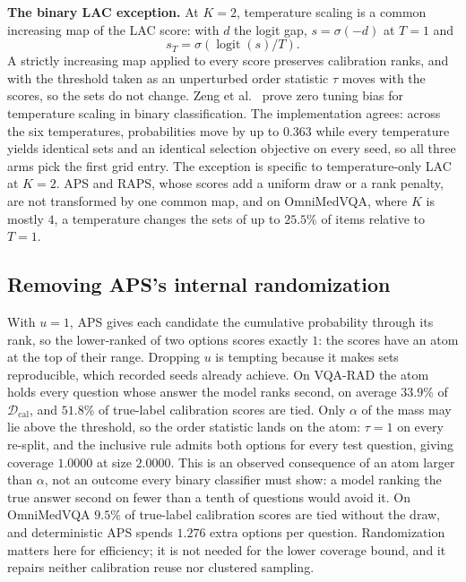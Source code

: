 \documentclass[a4paper,conference]{IEEEtran}
\newcommand{\Dcal}{\mathcal{D}_{\mathrm{cal}}}
\newcommand{\rtag}[1]{}
\begin{document}
\textbf{The binary LAC exception.} At $K=2$, temperature scaling is a common
increasing map of the LAC score: with $d$ the logit gap, $s=\sigma(-d)$ at
$T=1$ and
\begin{equation*}
s_T=\sigma\!\left(\operatorname{logit}(s)/T\right).
\end{equation*}
A strictly increasing map applied to every score preserves calibration ranks,
and with the threshold taken as an unperturbed order statistic $\tau$ moves
with the scores, so the sets do not change. Zeng et al.\
\cite[Prop.~5.1]{zeng2025tuningbias} prove zero tuning bias for temperature
scaling in binary classification. The implementation agrees: across the six
temperatures, probabilities move by up to $0.363$ while every temperature yields
identical sets and an identical selection objective on every seed, so all
three arms pick the first grid entry. The exception is specific to
temperature-only LAC at $K=2$. APS and RAPS, whose scores add a uniform draw
or a rank penalty, are not transformed by one common map, and on OmniMedVQA,
where $K$ is mostly $4$, a temperature changes the sets of up to $25.5\%$ of
items relative to $T=1$.

\subsection{Removing APS's internal randomization}

With $u=1$, APS gives each candidate the cumulative probability through its
rank, so the lower-ranked of two options scores exactly $1$: the scores have an
atom at the top of their range. Dropping $u$ is tempting because it makes sets
reproducible, which recorded seeds already achieve. On VQA-RAD the atom holds
every question whose answer the model ranks second, on average $33.9\%$ of
$\Dcal$, and $51.8\%$ of true-label calibration scores are tied. Only $\alpha$
of the mass may lie above the threshold, so the order statistic lands on the
atom: $\tau=1$ on every re-split, and the inclusive rule admits both options for
every test question, giving coverage $1.0000$ at size $2.0000$. This is an
observed consequence of an atom larger than $\alpha$, not an outcome every
binary classifier must show: a model ranking the true answer second on fewer
than a tenth of questions would avoid it.\rtag{R2.1} On OmniMedVQA $9.5\%$ of true-label
calibration scores are tied without the draw, and deterministic APS spends
$1.276$ extra options per question. Randomization matters here for efficiency;
it is not needed for the lower coverage bound, and it repairs neither
calibration reuse nor clustered sampling.
\end{document}
